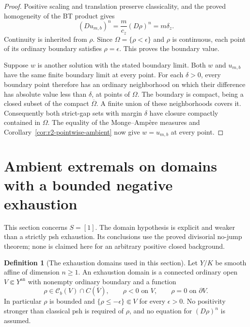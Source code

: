 \documentclass[11pt,a4paper]{article}
\numberwithin{equation}{section}
\theoremstyle{definition}
\newtheorem{definition}[theorem]{Definition}
\theoremstyle{remark}
\newcommand{\Cb}{\mathcal C_b}
\newcommand{\an}{\mathrm{an}}
\begin{document}
\begin{proof}
Positive scaling and translation preserve classicality,
and the proved homogeneity of the BT product gives
\[
 (Du_{m,b})^n=\frac m{c_z}(D\rho)^n=m\delta_z.
\]
Continuity is inherited from $\rho$. Since
$\Omega=\{\rho<\epsilon\}$ and $\rho$ is continuous,
each point of its ordinary boundary satisfies
$\rho=\epsilon$. This proves the boundary value.

Suppose $w$ is another solution with the stated boundary
limit. Both $w$ and $u_{m,b}$ have the same finite boundary
limit at every point. For each $\delta>0$, every boundary
point therefore has an ordinary neighborhood on which their
difference has absolute value less than $\delta$, at points
of $\Omega$. The boundary is compact, being a closed subset
of the compact $\overline\Omega$. A finite union of these
neighborhoods covers it. Consequently both strict-gap sets
with margin $\delta$ have closure compactly contained in
$\Omega$. The equality of the Monge--Amp\`ere measures
and Corollary~\ref{cor:r2-pointwise-ambient} now give
$w=u_{m,b}$ at every point.
\end{proof}



\section{Ambient extremals on domains with a bounded negative exhaustion}
\label{sec:r2-ambient-extremals}

This section concerns $S=[1]$. The domain hypothesis is explicit
and weaker than a strictly psh exhaustion. Its conclusions use
the proved divisorial no-jump theorem; none is claimed here for
an arbitrary positive closed background.

\begin{definition}[The exhaustion domains used in this section]
\label{def:r2-exhaustion-domain}
Let $Y/K$ be smooth affine of dimension $n\geq1$. An exhaustion
domain is a connected ordinary open $V\Subset Y^{\an}$ with
nonempty ordinary boundary and a function
\[
 \rho\in\Cb(V)\cap C(\overline V),\qquad
 \rho<0\text{ on }V,\qquad \rho=0\text{ on }\partial V.
\]
In particular $\rho$ is bounded and
$\{\rho\leq-\epsilon\}\Subset V$ for every $\epsilon>0$.
No positivity stronger than classical psh is required of $\rho$,
and no equation for $(D\rho)^n$ is assumed.
\end{definition}
\end{document}
